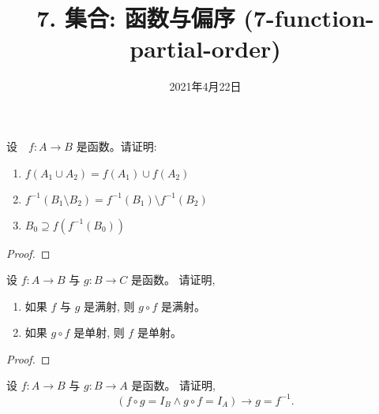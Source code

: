 \documentclass[a4paper, justified]{tufte-handout}
\title{7. 集合: 函数与偏序 (7-function-partial-order)}
\date{2021年4月22日}
\begin{document}
\maketitle
\noplagiarism %
\begin{abstract}
\end{abstract}
\beginrequired

\begin{problem}[\score{7 = 2 + 2 + 3} $\star\star$]
  设　$f: A \to B$ 是函数。请证明:
  \begin{enumerate}[(1)]
    \item $f(A_1 \cup A_2) = f(A_1) \cup f(A_2)$
    \item $f^{-1}(B_1 \setminus B_2) = f^{-1}(B_1) \setminus f^{-1}(B_2)$
    \item $B_0 \supseteq f(f^{-1}(B_0))$
  \end{enumerate}
\end{problem}

\begin{proof}
\end{proof}

\begin{problem}[\score{4 = 2 + 2} $\star\star$]
  设 $f: A \to B$ 与 $g: B \to C$ 是函数。
  请证明,
  \begin{enumerate}[(1)]
    \item 如果 $f$ 与 $g$ 是满射, 则 $g \circ f$ 是满射。
    \item 如果 $g \circ f$ 是单射, 则 $f$ 是单射。
  \end{enumerate}
\end{problem}

\begin{proof}
\end{proof}

\begin{problem}
  设 $f: A \to B$ 与 $g: B \to A$ 是函数。
  请证明,
  \[
    (f \circ g = I_B \land g \circ f = I_A) \to g = f^{-1}.
  \]
\end{problem}
\end{document}
